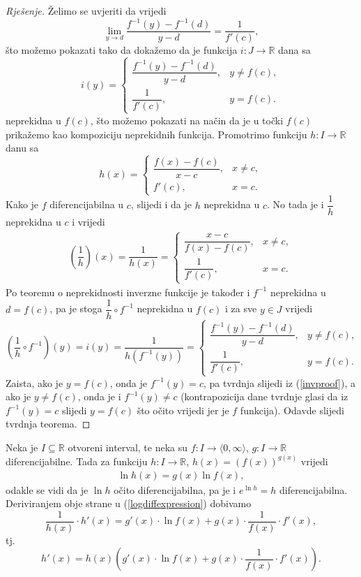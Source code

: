 \begin{proof}[Rješenje]
Želimo se uvjeriti da vrijedi
\[\lim\limits_{y\to d}{\dfrac{f^{-1}(y)-f^{-1}(d)}{y-d}}=\dfrac{1}{f'(c)},\]
što možemo pokazati tako da dokažemo da je funkcija \(i : J\to \mathbb{R}\) dana sa
\[i(y)=\begin{cases}
\dfrac{f^{-1}(y)-f^{-1}(d)}{y-d}, & y\neq f(c),\\
\dfrac{1}{f'(c)}, & y=f(c).
\end{cases}\]
neprekidna u \(f(c)\), što možemo pokazati na način da je u točki \(f(c)\) prikažemo kao kompoziciju neprekidnih funkcija.
Promotrimo funkciju \(h : I\to \mathbb{R}\) danu sa
\[h(x)=\begin{cases}
\dfrac{f(x)-f(c)}{x-c}, & x\neq c,\\
f'(c), & x=c.
\end{cases}\]
Kako je \(f\) diferencijabilna u \(c\), slijedi i da je \(h\) neprekidna u \(c\). No tada je i \(\dfrac{1}{h}\) neprekidna u \(c\) i vrijedi
\begin{align}
\label{invproof}
\left(\dfrac{1}{h}\right)(x)=\dfrac{1}{h(x)}=\begin{cases}
\dfrac{x-c}{f(x)-f(c)}, & x\neq c,\\
\dfrac{1}{f'(c)}, & x=c.
\end{cases}
\end{align}
Po teoremu o neprekidnosti inverzne funkcije je također i \(f^{-1}\) neprekidna u \(d=f(c)\), pa je stoga \(\dfrac{1}{h}\circ f^{-1}\) neprekidna u \(f(c)\) i za sve \(y\in J\) vrijedi
\[\left(\dfrac{1}{h}\circ f^{-1}\right)(y)=i(y)=\dfrac{1}{h\left(f^{-1}(y)\right)}=\begin{cases}
\dfrac{f^{-1}(y)-f^{-1}(d)}{y-d}, & y\neq f(c),\\
\dfrac{1}{f'(c)}, & y=f(c).
\end{cases}\]
Zaista, ako je \(y=f(c)\), onda je \(f^{-1}(y)=c\), pa tvrdnja slijedi iz (\ref{invproof}), a ako je \(y\neq f(c)\), onda je i \(f^{-1}(y)\neq c\) (kontrapozicija dane tvrdnje glasi da iz \(f^{-1}(y)=c\) slijedi \(y=f(c)\) što očito vrijedi jer je \(f\) funkcija). Odavde slijedi tvrdnja teorema.
\end{proof}
\begin{remark}
Neka je $I\subseteq \mathbb{R}$ otvoreni interval, te neka su $f : I\to \langle 0, \infty\rangle$, $g : I\to \mathbb{R}$ diferencijabilne. Tada za funkciju $h : I\to \mathbb{R}$, $h(x)=\left(f(x)\right)^{g(x)}$ vrijedi
\begin{gather}
\label{logdiffexpression}
\ln{h(x)}=g(x)\ln{f(x)},
\end{gather}
odakle se vidi da je $\ln{h}$ očito diferencijabilna, pa je i $e^{\ln{h}}=h$ diferencijabilna. Deriviranjem obje strane u (\ref{logdiffexpression}) dobivamo
$$\dfrac{1}{h(x)}\cdot h'(x)=g'(x)\cdot \ln{f(x)}+g(x)\cdot \dfrac{1}{f(x)}\cdot f'(x),$$
tj.
$$h'(x)=h(x)\left(g'(x)\cdot \ln{f(x)}+g(x)\cdot \dfrac{1}{f(x)}\cdot f'(x)\right).$$
\end{remark}
